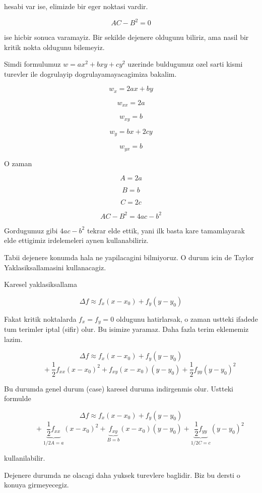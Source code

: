 \documentclass[12pt,fleqn]{article}\usepackage{../common}
\begin{document}
hesabi var ise, elimizde bir eger noktasi vardir. 

\[ AC - B^2 = 0 \]

ise hicbir sonuca varamayiz. Bir sekilde dejenere oldugunu biliriz, ama
nasil bir kritik nokta oldugunu bilemeyiz. 

Simdi formulumuz $w = ax^2 + bxy + cy^2$ uzerinde buldugumuz ozel sarti
kismi turevler ile dogrulayip dogrulayamayacagimiza bakalim. 

\[ w_{x} = 2ax + by\]

\[ w_{xx} = 2a\]

\[ w_{xy} = b\]

\[ w_{y} = bx + 2cy \]

\[ w_{yx} = b \]

O zaman

\[ A = 2a \]

\[ B = b \]

\[ C = 2c \]

\[ AC - B^2 = 4ac - b^2 \]

Gordugumuz gibi $4ac - b^2$ tekrar elde ettik, yani ilk basta kare
tamamlayarak elde ettigimiz irdelemeleri aynen kullanabiliriz. 

Tabii dejenere konumda hala ne yapilacagini bilmiyoruz. O durum icin de
Taylor Yaklasiksallamasini kullanacagiz. 

Karesel yaklasiksallama

\[ \Delta f \approx f_x (x - x_0) + f_y (y - y_0) \]

Fakat kritik noktalarda $f_x = f_y = 0$ oldugunu hatirlarsak, o zaman
ustteki ifadede tum terimler iptal (sifir) olur. Bu isimize yaramaz. Daha
fazla terim eklememiz lazim. 

\[ \Delta f \approx f_x (x - x_0) + f_y (y - y_0)   \]
\[\hspace{1cm}  + 
\frac{1}{2}f_{xx}(x-x_0)^2 + f_{xy}(x-x_0)(y-y_0) + 
\frac{1}{2}f_{yy}(y-y_0)^2 \]

Bu durumda genel durum (case) karesel duruma indirgenmis olur. Ustteki
formulde 

\[ \Delta f \approx f_x (x - x_0) + f_y (y - y_0)   \]
\[\hspace{1cm} + 
\underbrace{\frac{1}{2}f_{xx}}_{1/2 A = a}(x-x_0)^2 + 
\underbrace{f_{xy}}_{B=b}(x-x_0)(y-y_0) + 
\underbrace{\frac{1}{2}f_{yy}}_{1/2 C = c}(y-y_0)^2 \]

kullanilabilir. 

Dejenere durumda ne olacagi daha yuksek turevlere baglidir. Biz bu dersti o
konuya girmeyecegiz. 
\end{document}
